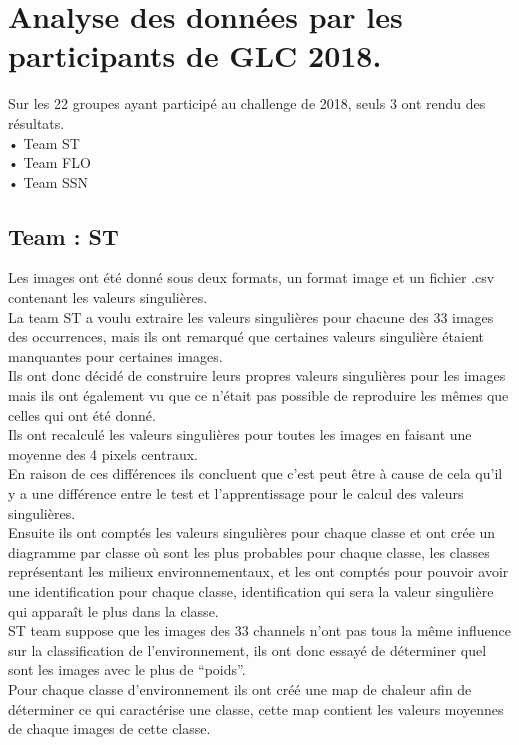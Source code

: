 \documentclass{article}
\begin{document}
\section{Analyse des données par les participants de GLC 2018.}
Sur les 22 groupes ayant participé au challenge de 2018, seuls 3 ont rendu des résultats.\\ 
• Team ST \\
• Team FLO\\
• Team SSN \\
\subsection{Team : ST}
Les images ont été donné sous deux formats, un format image et un fichier .csv contenant les valeurs singulières.\\
La team ST a voulu extraire les valeurs singulières pour chacune des 33 images des occurrences, mais ils ont remarqué que certaines valeurs singulière étaient manquantes pour certaines images.\\Ils ont donc décidé de construire leurs propres valeurs singulières pour les images mais ils ont également vu que ce n’était pas possible de reproduire les mêmes que celles qui ont été donné.\\Ils ont recalculé les valeurs singulières pour toutes les images en faisant une moyenne des 4 pixels centraux.\\ 
En raison de ces différences ils concluent que c’est peut être à cause de cela qu’il y a une différence entre le test et l’apprentissage pour le calcul des valeurs singulières. \\
Ensuite ils ont comptés les valeurs singulières pour chaque classe et ont crée un diagramme par classe où sont  les plus probables pour chaque classe, les classes représentant les milieux environnementaux, et les ont comptés pour pouvoir avoir une identification pour chaque classe, identification qui sera la valeur singulière qui apparaît le plus dans la classe.\\
ST team suppose que les images des 33 channels n’ont pas tous la même influence sur la classification de l’environnement, ils ont donc essayé de déterminer quel sont les images avec le plus de “poids”. \\Pour chaque classe d’environnement ils ont créé une map de chaleur afin de déterminer ce qui caractérise une classe, cette map contient les valeurs moyennes de chaque images de cette classe.\\
\end{document}
